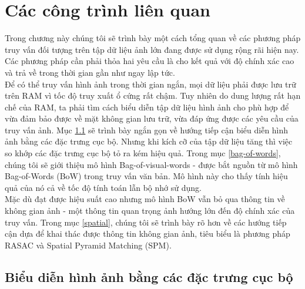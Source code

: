 \chapter{Các công trình liên quan}
\ifpdf
    \graphicspath{{Chapter2/Chapter2Figs/PNG/}{Chapter2/Chapter2Figs/PDF/}{Chapter2/Chapter2Figs/}}
\else
    \graphicspath{{Chapter2/Chapter2Figs/EPS/}{Chapter2/Chapter2Figs/}}
\fi


Trong chương này chúng tôi sẽ trình bày một cách tổng quan về các phương pháp truy vấn đối tượng trên tập dữ liệu ảnh lớn đang được sử dụng rộng rãi hiện nay. Các phương pháp cần phải thỏa hai yêu cầu là cho kết quả với độ chính xác cao và trả về trong thời gian gần như ngay lập tức.\\
Để có thể truy vấn hình ảnh trong thời gian ngắn, mọi dữ liệu phải được lưu trữ trên RAM vì tốc độ truy xuất ổ cứng rất chậm. Tuy nhiên do dung lượng rất hạn chế của RAM, ta phải tìm cách biểu diễn tập dữ liệu hình ảnh cho phù hợp để vừa đảm bảo được về mặt không gian lưu trữ, vừa đáp ứng được các yêu cầu của truy vấn ảnh. Mục \ref{local-features} sẽ trình bày ngắn gọn về hướng tiếp cận biểu diễn hình ảnh bằng các đặc trưng cục bộ. Nhưng khi kích cỡ của tập dữ liệu tăng thì việc so khớp các đặc trưng cục bộ tỏ ra kém hiệu quả. Trong mục \ref{bag-of-words}, chúng tôi sẽ giới thiệu mô hình Bag-of-visual-words -  được bắt nguồn từ mô hình Bag-of-Words (BoW) trong truy vấn văn bản. Mô hình này cho thấy tính hiệu quả của nó cả về tốc độ tính toán lẫn bộ nhớ sử dụng.\\
Mặc dù đạt được hiệu suất cao nhưng mô hình BoW vẫn bỏ qua thông tin về không gian ảnh - một thông tin quan trọng ảnh hướng lớn đến độ chính xác của truy vấn. Trong mục \ref{spatial}, chúng tôi sẽ trình bày rõ hơn về các hướng tiếp cận dựa để khai thác được thông tin không gian ảnh, tiêu biểu là phương pháp RASAC và Spatial Pyramid Matching (SPM).\\



\section{Biểu diễn hình ảnh bằng các đặc trưng cục bộ}
\label{local-features}

